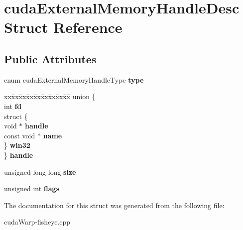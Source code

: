 \hypertarget{structcudaExternalMemoryHandleDesc}{}\section{cuda\+External\+Memory\+Handle\+Desc Struct Reference}
\label{structcudaExternalMemoryHandleDesc}
\subsection*{Public Attributes}
\begin{DoxyCompactItemize}
\item 
enum cuda\+External\+Memory\+Handle\+Type {\bfseries type}\hypertarget{structcudaExternalMemoryHandleDesc_a8d2b65d3b597280eb9be66ee34c7ee52}{}\label{structcudaExternalMemoryHandleDesc_a8d2b65d3b597280eb9be66ee34c7ee52}

\item 
\begin{tabbing}
xx\=xx\=xx\=xx\=xx\=xx\=xx\=xx\=xx\=\kill
union \{\\
\>int {\bfseries fd}\\
\>struct \{\\
\>\>void $\ast$ {\bfseries handle}\\
\>\>const void $\ast$ {\bfseries name}\\
\>\} {\bfseries win32}\\
\} {\bfseries handle}\hypertarget{structcudaExternalMemoryHandleDesc_a9af52765434c5bc13d08e39108cb0c8c}{}\label{structcudaExternalMemoryHandleDesc_a9af52765434c5bc13d08e39108cb0c8c}
\\

\end{tabbing}\item 
unsigned long long {\bfseries size}\hypertarget{structcudaExternalMemoryHandleDesc_a362086a22da90ac8fba1ca294e65548e}{}\label{structcudaExternalMemoryHandleDesc_a362086a22da90ac8fba1ca294e65548e}

\item 
unsigned int {\bfseries flags}\hypertarget{structcudaExternalMemoryHandleDesc_a74412d3d2777ebc856aea0b9158aaafa}{}\label{structcudaExternalMemoryHandleDesc_a74412d3d2777ebc856aea0b9158aaafa}

\end{DoxyCompactItemize}


The documentation for this struct was generated from the following file\+:\begin{DoxyCompactItemize}
\item 
cuda\+Warp-\/fisheye.\+cpp\end{DoxyCompactItemize}

